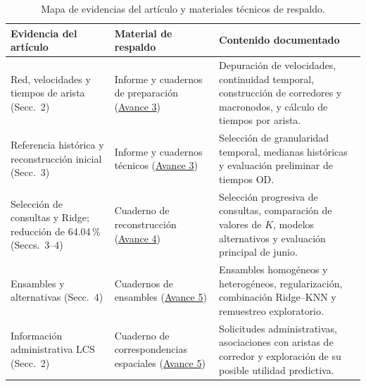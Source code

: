 \documentclass[letterpaper,11pt]{article}
\begin{document}
\begin{table}[H]
\centering
\footnotesize
\renewcommand{\arraystretch}{1.10}
\caption{Mapa de evidencias del artículo y materiales técnicos de respaldo.}
\label{tab:traza}

\begin{tabular}{@{}
>{\raggedright\arraybackslash}p{.25\linewidth}
>{\raggedright\arraybackslash}p{.27\linewidth}
>{\raggedright\arraybackslash}p{.40\linewidth}
@{}}
\toprule
Evidencia del artículo &
Material de respaldo &
Contenido documentado \\
\midrule

Red, velocidades y tiempos de arista (Secc.~2) &
Informe y cuadernos de preparación
(\href{https://github.com/Luis-MX/route-intelligence/tree/main/docs/entregas/avance-3-baseline}{Avance 3}) &
Depuración de velocidades, continuidad temporal, construcción de corredores y macronodos, y cálculo de tiempos por arista. \\

Referencia histórica y reconstrucción inicial (Secc.~3) &
Informe y cuadernos técnicos
(\href{https://github.com/Luis-MX/route-intelligence/tree/main/docs/entregas/avance-3-baseline}{Avance 3}) &
Selección de granularidad temporal, medianas históricas y evaluación preliminar de tiempos OD. \\

Selección de consultas y Ridge; reducción de 64.04\,\% (Seccs.~3--4) &
Cuaderno de reconstrucción
(\href{https://github.com/Luis-MX/route-intelligence/tree/main/docs/entregas/avance-4-modelos-alternativos}{Avance 4}) &
Selección progresiva de consultas, comparación de valores de $K$, modelos alternativos y evaluación principal de junio. \\

Ensambles y alternativas (Secc.~4) &
Cuadernos de ensambles
(\href{https://github.com/Luis-MX/route-intelligence/tree/main/docs/entregas/avance-5-ensambles-y-contexto}{Avance 5}) &
Ensambles homogéneos y heterogéneos, regularización, combinación Ridge--KNN y remuestreo exploratorio. \\

Información administrativa LCS (Secc.~2) &
Cuaderno de correspondencias espaciales
(\href{https://github.com/Luis-MX/route-intelligence/tree/main/docs/entregas/avance-5-ensambles-y-contexto}{Avance 5}) &
Solicitudes administrativas, asociaciones con aristas de corredor y exploración de su posible utilidad predictiva. \\


\end{tabular}
\end{table}
\end{document}
